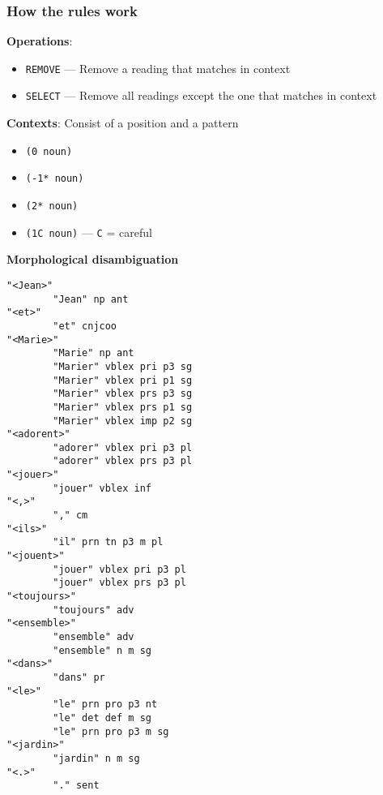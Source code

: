 \documentclass[10pt,xetex]{beamer} %
\begin{document}
\begin{frame}
  \frametitle{How the rules work}

{\bf Operations}:

\begin{itemize}

  \item \texttt{REMOVE} --- Remove a reading that matches in  context

  \item \texttt{SELECT} --- Remove all readings except the one that matches in context
\end{itemize}

{\bf Contexts}: Consist of a \alert<2>{position} and a \alert<3>{pattern}

\begin{itemize}
  \item \texttt{(\alert<2>{0} \alert<3>{noun})}
  \item \texttt{(\alert<2>{-1*} \alert<3>{noun})}
  \item \texttt{(\alert<2>{2*} \alert<3>{noun})}
  \item \texttt{(\alert<2>{1}\alert<3>{C noun})} --- \texttt{C} = careful
\end{itemize}


\end{frame}


\begin{frame}


 \begin{center}
 {\Large {\bf Morphological disambiguation}}
 \end{center}

\end{frame}

\begin{frame}[fragile]

\begin{multicols}{2}
\begin{verbatim}
"<Jean>"
        "Jean" np ant
"<et>"
        "et" cnjcoo
"<Marie>"
        "Marie" np ant
        "Marier" vblex pri p3 sg
        "Marier" vblex pri p1 sg
        "Marier" vblex prs p3 sg
        "Marier" vblex prs p1 sg
        "Marier" vblex imp p2 sg
"<adorent>"
        "adorer" vblex pri p3 pl
        "adorer" vblex prs p3 pl
"<jouer>"
        "jouer" vblex inf
"<,>"
        "," cm
"<ils>"
        "il" prn tn p3 m pl
"<jouent>"
        "jouer" vblex pri p3 pl
        "jouer" vblex prs p3 pl
"<toujours>"
        "toujours" adv
"<ensemble>"
        "ensemble" adv
        "ensemble" n m sg
"<dans>"
        "dans" pr
"<le>"
        "le" prn pro p3 nt
        "le" det def m sg
        "le" prn pro p3 m sg
"<jardin>"
        "jardin" n m sg
"<.>"
        "." sent

\end{verbatim}
\end{multicols}

\end{frame}
\end{document}

